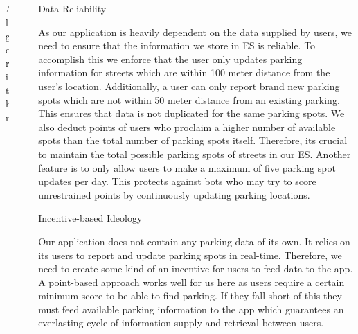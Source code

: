 \documentclass[final]{beamer}
\newlength{\sepwid}
\newlength{\onecolwid}
\begin{document}
\begin{frame}[t]
\begin{columns}[t]
\begin{column}{\onecolwid}
\begin{block}{Algorithm}
\end{block}
\end{column} %

\begin{column}{\sepwid}\end{column} %

\begin{column}{\onecolwid} %

\begin{block}{Data Reliability}

As our application is heavily dependent on the data supplied by users, we need to ensure that the information we store in ES is reliable. To accomplish this we enforce that the user only updates parking information for streets which are within 100 meter distance from the user's location. Additionally, a user can only report brand new parking spots which are not within 50 meter distance from an existing parking. This ensures that data is not duplicated for the same parking spots. We also deduct points of users who proclaim a higher number of available spots than the total number of parking spots itself. Therefore, its crucial to maintain the total possible parking spots of streets in our ES. Another feature is to only allow users to make a maximum of five parking spot updates per day. This protects against bots who may try to score unrestrained points by continuously updating parking locations. 
\end{block}


\begin{block}{Incentive-based Ideology}

Our application does not contain any parking data of its own. It relies on its users to report and update parking spots in real-time. Therefore, we need to create some kind of an incentive for users to feed data to the app. A point-based approach works well for us here as users require a certain minimum score to be able to find parking. If they fall short of this they must feed available parking information to the app which guarantees an everlasting cycle of information supply and retrieval between users.
\end{block}




\end{column}
\end{columns}
\end{frame}
\end{document}
